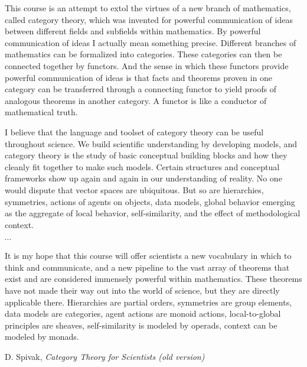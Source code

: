 \documentclass[11pt]{book}
\begin{document}
\pagebreak
\epigraph{This course is an attempt to extol the virtues of a new branch of mathematics,
called category theory, which was invented for powerful communication of ideas between
different fields and subfields within mathematics. By powerful communication of ideas I
actually mean something precise. Different branches of mathematics can be formalized
into categories. These categories can then be connected together by functors. And the
sense in which these functors provide powerful communication of ideas is that facts and
theorems proven in one category can be transferred through a connecting functor to
yield proofs of analogous theorems in another category. A functor is like a conductor of
mathematical truth.
\par
I believe that the language and toolset of category theory can be useful throughout
science. We build scientific understanding by developing models, and category theory is
the study of basic conceptual building blocks and how they cleanly fit together to make
such models. Certain structures and conceptual frameworks show up again and again in
our understanding of reality. No one would dispute that vector spaces are ubiquitous.
But so are hierarchies, symmetries, actions of agents on objects, data models, global
behavior emerging as the aggregate of local behavior, self-similarity, and the effect of
methodological context.
\par
$\cdots$
\par
It is my hope that this course will offer scientists a new vocabulary in which to think
and communicate, and a new pipeline to the vast array of theorems that exist and are
considered immensely powerful within mathematics. These theorems have not made their
way out into the world of science, but they are directly applicable there. Hierarchies are
partial orders, symmetries are group elements, data models are categories, agent actions
are monoid actions, local-to-global principles are sheaves, self-similarity is modeled by
operads, context can be modeled by monads.}
{D. Spivak, \textit{Category Theory for Scientists 
(old version)}~\cite{spivakd_2013_cath_for_scientists}}
\end{document}
